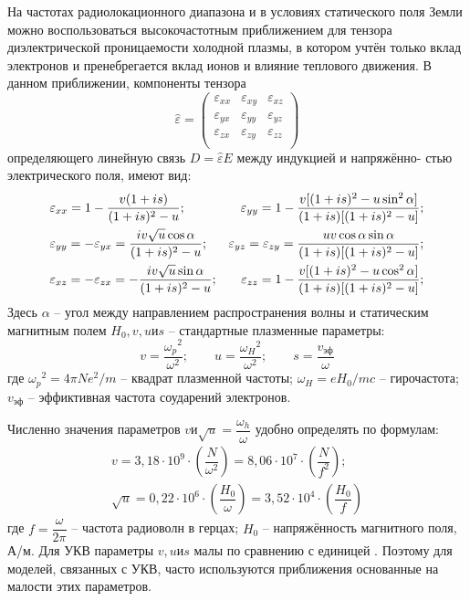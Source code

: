 На частотах радиолокационного диапазона и в условиях статического поля Земли можно воспользоваться высокочастотным
приближением для тензора диэлектрической проницаемости холодной плазмы, в котором учтён только вклад электронов и
пренебрегается вклад ионов и влияние теплового движения. В данном приближении, компоненты тензора
\begin{equation*}
	\hat{\varepsilon} = 
		\begin{pmatrix}
			\varepsilon_{xx} & \varepsilon_{xy} & \varepsilon_{xz} \\
			\varepsilon_{yx} & \varepsilon_{yy} & \varepsilon_{yz} \\
			\varepsilon_{zx} & \varepsilon_{zy} & \varepsilon_{zz} \\
		\end{pmatrix}
\end{equation*}
определяющего линейную связь $D = \hat{\varepsilon} E$ между индукцией и напряжённо-
стью электрического поля, имеют вид:
\begin{equation*}
	\begin{aligned}
		&	\varepsilon_{xx} = 1 - \dfrac{v(1 + is)}{(1 + is)^2 - u}; \hfill \qquad &
			\varepsilon_{yy} = 1 - \dfrac{v[(1 + is)^2 - u\sin^2{\alpha}]}{(1 + is)[(1 + is)^2 - u]}; & \\
		&	\varepsilon_{yy} = -\varepsilon_{yx} = \dfrac{iv \sqrt{u} \cos{\alpha}}{(1 + is)^2 - u}; &
			\varepsilon_{yz} = \varepsilon_{zy} = 
				\dfrac{uv \cos{\alpha} \sin{\alpha}}{(1 + is)[(1 + is)^2 - u]}; & \\
		&	\varepsilon_{xz} = -\varepsilon_{zx} = -\dfrac{iv\sqrt{u}\sin{\alpha}}{(1 + is)^2 - u}; &
			\varepsilon_{zz} = 1 - \dfrac{v[(1 + is)^2 - u \cos^2{\alpha}]}{(1 + is)[(1 + is)^2 - u]}; &
	\end{aligned}
\end{equation*}
Здесь $\alpha$ -- угол между направлением распространения волны и статическим магнитным полем 
$H_0,v,u и s$ -- стандартные плазменные параметры:
\begin{equation*}
	v = \dfrac{{\omega_p}^2}{\omega^2}; \qquad
	u = \dfrac{{\omega_H}^2}{\omega^2}; \qquad
	s = \dfrac{v_{эф}}{\omega}
\end{equation*}
где ${\omega_p}^2 = 4\pi Ne^2/m$ -- квадрат плазменной частоты; $\omega_H = eH_0/mc$ -- гирочастота; 
$v_{эф}$ -- эффиктивная частота соударений электронов.

Численно значения параметров $v и \sqrt{u} = \dfrac{\omega_h}{\omega}$ удобно определять по формулам:
\begin{equation*}
	\begin{split}
		v = 3,18 \cdot 10^9 \cdot (\dfrac{N}{\omega^2}) = 8,06 \cdot 10^7 \cdot (\dfrac{N}{f^2}); \\
		\sqrt{u} = 0,22 \cdot 10^6 \cdot (\dfrac{H_0}{\omega}) = 3,52 \cdot 10^4 \cdot (\dfrac{H_0}{f})
	\end{split}
\end{equation*}
где $f = \dfrac{\omega}{2\pi}$ -- частота радиоволн в герцах; $H_0$ -- напряжённость магнитного поля, А/м. Для УКВ параметры $v, u и s$ малы по сравнению с единицей \cite{Kravcov}. Поэтому для моделей, связанных с УКВ, часто используются приближения основанные на малости этих параметров.

